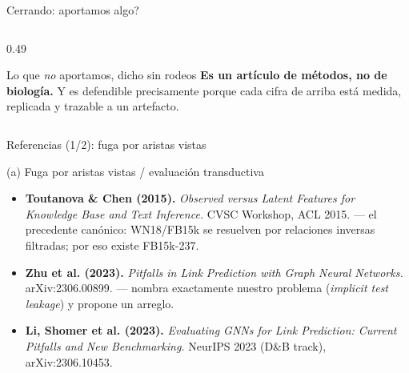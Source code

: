 \begin{frame}{Cerrando: \textquestiondown{}aportamos algo?}
\begin{columns}[T]
\begin{column}{0.49\textwidth}
{\begin{block}{Lo que \emph{no} aportamos, dicho sin rodeos}
        \vspace{0.25em}
        \textbf{Es un art\'iculo de m\'etodos, no de biolog\'ia.} Y es defendible
        precisamente porque cada cifra de arriba est\'a medida, replicada y trazable a un
        artefacto.
      \end{block}}
    \end{column}
  \end{columns}
\end{frame}

\begin{frame}{Referencias (1/2): fuga por aristas vistas}
  \small
  \begin{block}{(a) Fuga por aristas vistas / evaluaci\'on transductiva}
    \scriptsize
    \begin{itemize}
      \item \textbf{Toutanova \& Chen (2015).} \emph{Observed versus Latent Features for
            Knowledge Base and Text Inference.} CVSC Workshop, ACL 2015. --- el precedente
            can\'onico: WN18/FB15k se resuelven por relaciones inversas filtradas; por eso
            existe FB15k-237.
      \item \textbf{Zhu et al. (2023).} \emph{Pitfalls in Link Prediction with Graph Neural
            Networks.} arXiv:2306.00899. --- nombra exactamente nuestro problema
            (\emph{implicit test leakage}) y propone un arreglo.
      \item \textbf{Li, Shomer et al. (2023).} \emph{Evaluating GNNs for Link Prediction:
            Current Pitfalls and New Benchmarking.} NeurIPS 2023 (D\&B track),
            arXiv:2306.10453.
    \end{itemize}
  \end{block}

  \vspace{0.4em}
\end{frame}

